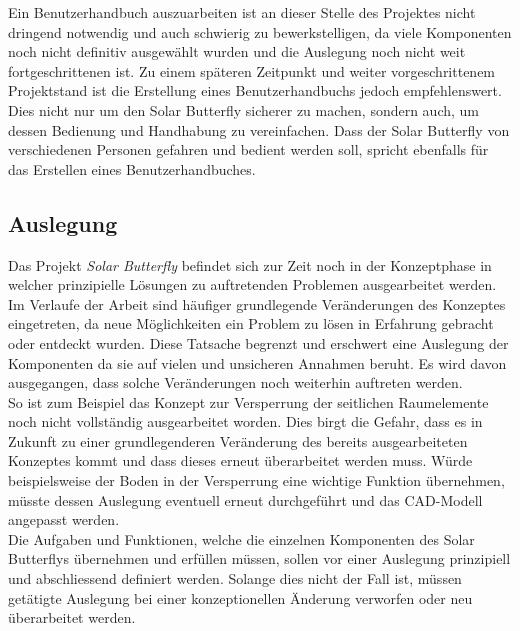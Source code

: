 Ein Benutzerhandbuch auszuarbeiten ist an dieser Stelle des Projektes nicht dringend notwendig und auch schwierig zu bewerkstelligen, da viele Komponenten noch nicht definitiv ausgewählt wurden und die Auslegung noch nicht weit fortgeschrittenen ist. Zu einem späteren Zeitpunkt und weiter vorgeschrittenem Projektstand ist die Erstellung eines Benutzerhandbuchs jedoch empfehlenswert. Dies nicht nur um den Solar Butterfly sicherer zu machen, sondern auch, um dessen Bedienung und Handhabung zu vereinfachen. Dass der Solar Butterfly von verschiedenen Personen gefahren und bedient werden soll, spricht ebenfalls für das Erstellen eines Benutzerhandbuches.


\subsection{Auslegung}
Das Projekt \emph{Solar Butterfly} befindet sich zur Zeit noch in der Konzeptphase in welcher prinzipielle Lösungen zu auftretenden Problemen ausgearbeitet werden. Im Verlaufe der Arbeit sind häufiger grundlegende Veränderungen des Konzeptes eingetreten, da neue Möglichkeiten ein Problem zu lösen in Erfahrung gebracht oder entdeckt wurden. Diese Tatsache begrenzt und erschwert eine Auslegung der Komponenten da sie auf vielen und unsicheren Annahmen beruht. Es wird davon ausgegangen, dass solche Veränderungen noch weiterhin auftreten werden.\\
So ist zum Beispiel das Konzept zur Versperrung der seitlichen Raumelemente noch nicht vollständig ausgearbeitet worden. Dies birgt die Gefahr, dass es in Zukunft zu einer grundlegenderen Veränderung des bereits ausgearbeiteten Konzeptes kommt und dass dieses erneut überarbeitet werden muss. Würde beispielsweise der Boden in der Versperrung eine wichtige Funktion übernehmen, müsste dessen Auslegung eventuell erneut durchgeführt und das CAD-Modell angepasst werden.\\
Die Aufgaben und Funktionen, welche die einzelnen Komponenten des Solar Butterflys übernehmen und erfüllen müssen, sollen vor einer Auslegung prinzipiell und abschliessend definiert werden. Solange dies nicht der Fall ist, müssen getätigte Auslegung bei einer konzeptionellen Änderung verworfen oder neu überarbeitet werden.

